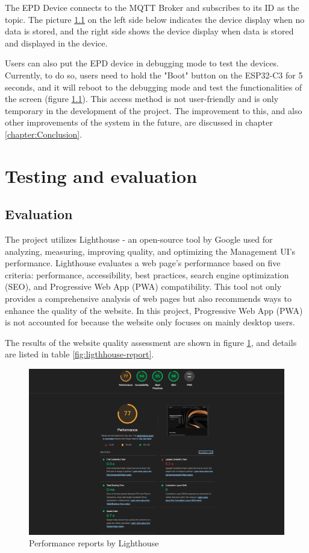 \documentclass[../Main.tex]{subfiles}
\begin{document}
The EPD Device connects to the MQTT Broker and subscribes to its ID as the topic. The picture \ref{} on the left side below indicates the device display when no data is stored, and the right side shows the device display when data is stored and displayed in the device. 

Users can also put the EPD device in debugging mode to test the devices. Currently, to do so, users need to hold the "Boot" button on the ESP32-C3 for 5 seconds, and it will reboot to the debugging mode and test the functionalities of the screen (figure \ref{}). This access method is not user-friendly and is only temporary in the development of the project. The improvement to this, and also other improvements of the system in the future, are discussed in chapter \ref{chapter:Conclusion}.

\section{Testing and evaluation}
\subsection{Evaluation}
The project utilizes Lighthouse - an open-source tool by Google used for analyzing, measuring, improving quality, and optimizing the Management UI's performance. Lighthouse evaluates a web page's performance based on five criteria: performance, accessibility, best practices, search engine optimization (SEO), and Progressive Web App (PWA) compatibility. This tool not only provides a comprehensive analysis of web pages but also recommends ways to enhance the quality of the website. In this project, Progressive Web App (PWA) is not accounted for because the website only focuses on mainly desktop users. 

The results of the website quality assessment are shown in figure \ref{fig:ui_light-house}, and details are listed in table \ref{fig:ligthhouse-report}.
\begin{figure}[H]
    \centering
    \includegraphics[width=0.85\linewidth]{doc//imgs/ui_light-house.png}
    \caption{Performance reports by Lighthouse}
    \label{fig:ui_light-house}
\end{figure}
\end{document}
